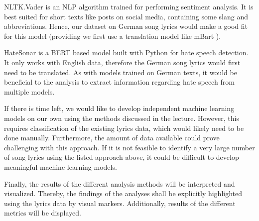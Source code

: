 NLTK.Vader \cite{vader} is an NLP algorithm trained for performing sentiment analysis. It is best suited for short texts like posts on social media, containing some slang and abbreviations. Hence, our dataset on German song lyrics would make a good fit for this model (providing we first use a translation model like mBart \cite{mBart}).

HateSonar \cite{davidson2017automated} is a BERT based model built with Python for hate speech detection. It only works with English data, therefore the German song lyrics would first need to be translated. As with models trained on German texts, it would be beneficial to the analysis to extract information regarding hate speech from multiple models.

If there is time left, we would like to develop independent machine learning models on our own using the methods discussed in the lecture. However, this requires classification of the existing lyrics data, which would likely need to be done manually. Furthermore, the amount of data available could prove challenging with this approach. If it is not feasible to identify a very large number of song lyrics using the listed approach above, it could be difficult to develop meaningful machine learning models.

Finally, the results of the different analysis methods will be interpreted and visualized. Thereby, the findings of the analyses shall be explicitly highlighted using the lyrics data by visual markers. Additionally, results of the different metrics will be displayed. 